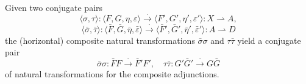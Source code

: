 Given two conjugate pairs
$$\langle \sigma, \tau \rangle : \langle F, G, \eta, \varepsilon \rangle \xrightarrow{\cdot} \langle F', G', \eta', \varepsilon' \rangle : X \rightharpoonup A,$$
$$\langle \bar{\sigma}, \bar{\tau} \rangle : \langle \bar{F}, \bar{G}, \bar{\eta}, \bar{\varepsilon} \rangle \xrightarrow{\cdot} \langle \bar{F}', \bar{G}', \bar{\eta}', \bar{\varepsilon}' \rangle : A \rightharpoonup D$$
the (horizontal) composite natural transformations $\bar{\sigma}\sigma$ and $\tau\bar{\tau}$ yield a conjugate pair
$$\bar{\sigma}\sigma : \bar{F}F \xrightarrow{\cdot} \bar{F}'F', \quad \tau\bar{\tau} : G'\bar{G}' \xrightarrow{\cdot} G\bar{G}$$
of natural transformations for the composite adjunctions.
